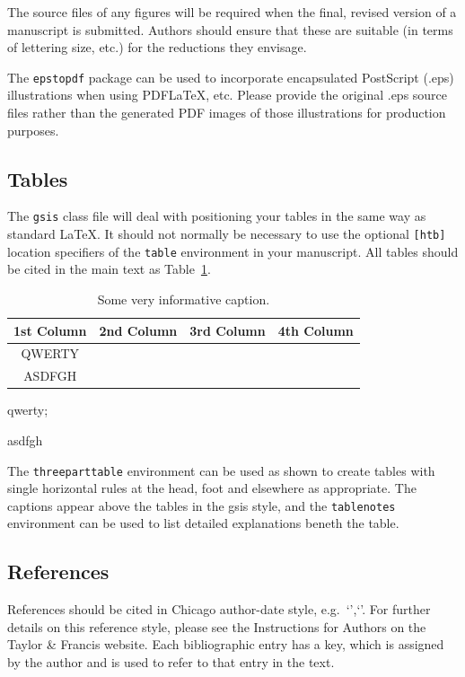 \documentclass[12pt]{gsis}  %
\begin{document}
The source files of any figures will be required when the final, revised version of a manuscript is submitted. Authors should ensure that these are suitable (in terms of lettering size, etc.) for the reductions they envisage.

The \texttt{epstopdf} package can be used to incorporate encapsulated PostScript (.eps) illustrations when using PDF\LaTeX, etc. Please provide the original .eps source files rather than the generated PDF images of those illustrations for production purposes.

\subsection{Tables}
The \texttt{gsis} class file will deal with positioning your tables in the same way as standard \LaTeX. It should not normally be necessary to use the optional \texttt{[htb]} location specifiers of the \texttt{table} environment in your manuscript. All tables should be cited in the main text as Table~\ref{tab1}.

\begin{table}[htb]
    \caption{Some very informative caption.}
    \begin{threeparttable}
    \begin{tabular}{c c c c}
        \toprule
        \textbf{1st Column} & \textbf{2nd Column} & \textbf{3rd Column} & \textbf{4th Column} \\ \midrule
          QWERTY\tnote{1}   &                     &                     &  \\
          ASDFGH\tnote{2}   &                     &                     &  \\ \bottomrule
    \end{tabular}
    \begin{tablenotes}
    \item[1] qwerty; \item[2] asdfgh
    \end{tablenotes}
    \end{threeparttable}
    \label{tab1}
\end{table}

The \texttt{threeparttable} environment can be used as shown to create tables with single horizontal rules at the head, foot and elsewhere as appropriate. The captions appear above the tables in the \textsf{gsis} style, and the \texttt{tablenotes} environment can be used to list detailed explanations beneth the table. 


\subsection{References}
References should be cited in Chicago author-date style, e.g.\ `\citep{yao2024research}',`\citep{batz2015hybrid, gao2013convergence}'. For further details on this reference style, please see the Instructions for Authors on the Taylor \& Francis website. Each bibliographic entry has a key, which is assigned by the author and is used to refer to that entry in the text. 
\end{document}
